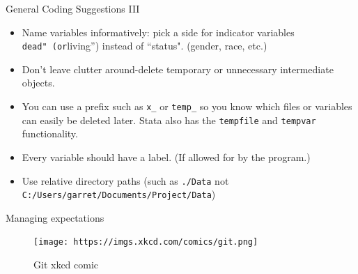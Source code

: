 \documentclass[ignorenonframetext,]{beamer}
\providecommand{\tightlist}{%
  \setlength{\itemsep}{0pt}\setlength{\parskip}{0pt}}
\begin{document}
\begin{frame}[fragile]{General Coding Suggestions III}
\protect\hypertarget{general-coding-suggestions-iii}{}

\begin{itemize}
\tightlist
\item
  Name variables informatively: pick a side for indicator variables
  \texttt{dead"\ (or}living'') instead of ``status". (gender, race,
  etc.)
\item
  Don't leave clutter around-delete temporary or unnecessary
  intermediate objects.

  \item

  You can use a prefix such as \texttt{x\_} or \texttt{temp\_} so you
  know which files or variables can easily be deleted later. Stata also
  has the \texttt{tempfile} and \texttt{tempvar} functionality.\\
\item
  Every variable should have a label. (If allowed for by the program.)
\item
  Use relative directory paths (such as \texttt{./Data} not
  \texttt{C:/Users/garret/Documents/Project/Data})
\end{itemize}

\end{frame}

\begin{frame}{Managing expectations}
\protect\hypertarget{managing-expectations}{}

\begin{figure}
\centering
\texttt{[image: https://imgs.xkcd.com/comics/git.png]}
\caption{Git xkcd comic}
\end{figure}

\end{frame}
\end{document}
